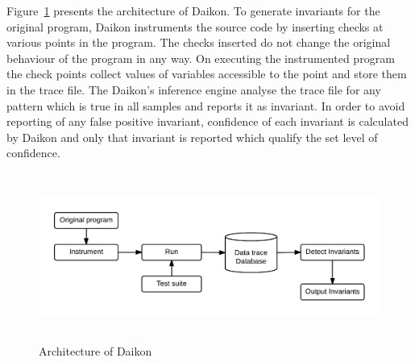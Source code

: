 Figure~\ref{fig:daikon} presents the architecture of Daikon. To generate invariants for the original program, Daikon instruments the source code by inserting checks at various points in the program. The checks inserted do not change the original behaviour of the program in any way. On executing the instrumented program the check points collect values of variables accessible to the point and store them in the trace file. The Daikon's inference engine analyse the trace file for any pattern which is true in all samples and reports it as invariant. In order to avoid reporting of any false positive invariant, confidence of each invariant is calculated by Daikon and only that invariant is reported which qualify the set level of confidence. 

\bigskip
\begin{figure}[H]
\centering
\includegraphics[width= 15.5cm,height=5.5cm]{chapter7/daikonWorking1.png}
\bigskip
\caption{Architecture of Daikon~\cite{ernst2001dynamically}}
\label{fig:daikon}
\end{figure}
\bigskip

